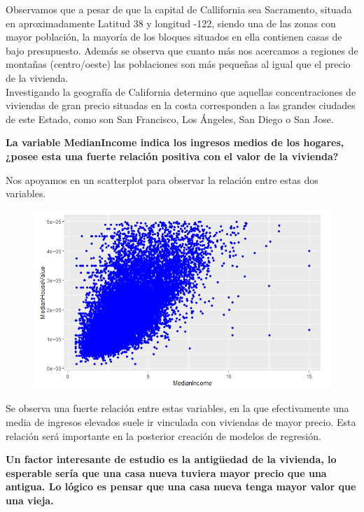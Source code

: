 Observamos que a pesar de que la capital de Callifornia sea Sacramento, situada en aproximadamente Latitud 38 y longitud -122, siendo una de las zonas con mayor población, la mayoría de los bloques situados en ella contienen casas de bajo presupuesto. Además se observa que cuanto más nos acercamos a regiones de montañas (centro/oeste) las poblaciones son más pequeñas al igual que el precio de la vivienda.\\

Investigando la geografía de California determino que aquellas concentraciones de viviendas de gran precio situadas en la costa corresponden a las grandes ciudades de este Estado, como son San Francisco, Los Ángeles, San Diego o San Jose. 



\newpage
\textbf{La variable MedianIncome indica los ingresos medios de los hogares, ¿posee esta una fuerte relación positiva con el valor de la vivienda?}

Nos apoyamos en un scatterplot para observar la relación entre estas dos variables.

\begin{figure}[h!]
	\centering
	\includegraphics[width=0.7\linewidth]{figures/hipo_5}
	\caption{}
	\label{fig:hipo5}
\end{figure}

Se observa una fuerte relación entre estas variables, en la que efectivamente una media de ingresos elevados suele ir vinculada con viviendas de mayor precio. Esta relación será importante en la posterior creación de modelos de regresión.



\newpage
\textbf{Un factor interesante de estudio es la antigüedad de la vivienda, lo esperable sería que una casa nueva tuviera mayor precio que una antigua. Lo lógico es pensar que una casa nueva tenga mayor valor que una vieja.}


